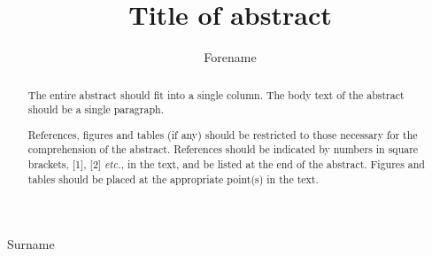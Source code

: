 \documentclass[abstract]{iucr}              %
\begin{document}



\title{Title of abstract}


\author[b]{Forename}{Surname}




\maketitle                        %

\begin{abstract}
The entire abstract should fit into a single column. The body text of the
abstract should be a single paragraph.

References, figures and tables (if any) should be restricted to those
necessary for the comprehension of the abstract. References should be
indicated by numbers in square brackets, [1], [2] \textit{etc.}, in the
text, and be listed at the end of the abstract. Figures and tables
should be placed at the appropriate point(s) in the text.
\end{abstract}

\end{document}
